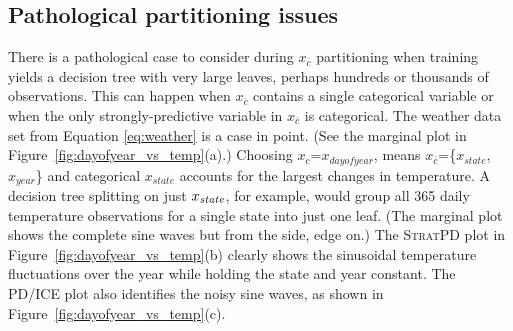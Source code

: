 \documentclass[12pt]{article}
\newcommand{\figref}[1]{Figure~\ref{#1}}
\newcommand{\spd}{\fontfamily{cmr}\textsc{\small StratPD}}
\newcommand{\xnc}{$x_{\overline{c}}$}
\begin{document}
\subsection{Pathological partitioning issues}\label{sec:tuning}

There is a pathological case to consider during \xnc{} partitioning when training yields a decision tree with very large leaves, perhaps hundreds or thousands of observations.  This can happen when \xnc{} contains a single categorical variable or when the only strongly-predictive variable in \xnc{} is categorical.  The weather data set from Equation \ref{eq:weather} is a case in point. (See the marginal plot in \figref{fig:dayofyear_vs_temp}(a).) Choosing $x_c$=$x_{dayofyear}$, means \xnc{}=\{$x_{state}$,$x_{year}$\} and categorical $x_{state}$ accounts for the largest changes in temperature.   A decision tree splitting on just $x_{\it state}$, for example, would group all 365 daily temperature observations for a single state into just one leaf. (The marginal plot shows the complete sine waves but from the side, edge on.)   The \spd{} plot in \figref{fig:dayofyear_vs_temp}(b) clearly shows the sinusoidal temperature fluctuations over the year while holding the state and year constant. The PD/ICE plot also identifies the noisy sine waves, as shown in \figref{fig:dayofyear_vs_temp}(c).
\end{document}
